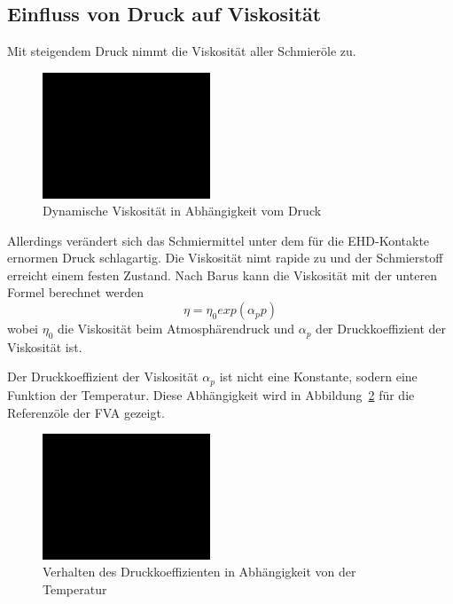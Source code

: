 \subsection*{Einfluss von Druck auf Viskosität}
\label{sub:einfluss_von_druck_auf_viskositaet}
Mit steigendem Druck nimmt die Viskosität aller Schmieröle zu.
\begin{figure}[htb]
    \centering
    \includegraphics[width=5cm]{./images/blank_img.jpg}
    \caption{Dynamische Viskosität in Abhängigkeit vom Druck}
    \label{fig:dynamische_viskositaet_in_abhaengigkeit_vom_druck}
\end{figure}
%
Allerdings verändert sich das Schmiermittel unter dem für die EHD-Kontakte ernormen Druck schlagartig.
Die Viskosität nimt rapide zu und der Schmierstoff erreicht einem festen Zustand.
Nach Barus kann die Viskosität mit der unteren Formel berechnet werden
\begin{equation}
    \eta = \eta_0  exp(\alpha_p  p)
    \label{eq:dynamische_viskositaet_druck_barus}
\end{equation}
%
wobei $\eta_0$ die Viskosität beim Atmosphärendruck und $\alpha_p$ der Druckkoeffizient der Viskosität ist.

Der Druckkoeffizient der Viskosität $\alpha_p$ ist nicht eine Konstante, sodern eine Funktion der Temperatur.
Diese Abhängigkeit wird in Abbildung~\ref{fig:druckkoeffizient_temperatur} für die Referenzöle der FVA gezeigt.
\begin{figure}[htb]
    \centering
    \includegraphics[width=5cm]{./images/blank_img.jpg}
    \caption{Verhalten des Druckkoeffizienten in Abhängigkeit von der Temperatur}
    \label{fig:druckkoeffizient_temperatur}
\end{figure}
%

